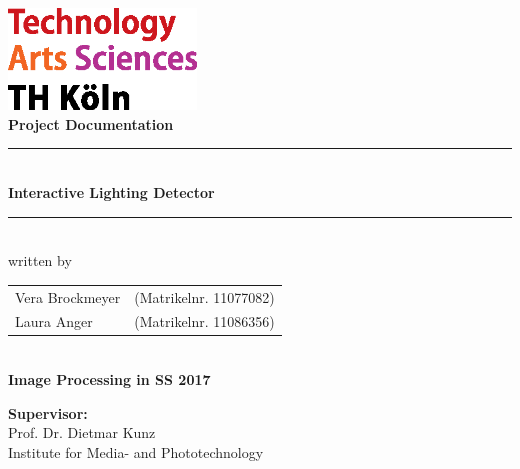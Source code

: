 \thispagestyle{empty}
\begin{center}
	\includegraphics[width=5cm]{Images/logo_TH}\\[12ex]
	{\Huge\textbf{Project Documentation}}\\[8ex]
	\rule{.8\textwidth}{.2pt}
	{\Large\\[1ex] \textbf{Interactive Lighting Detector}}\\
	\rule{.8\textwidth}{.2pt}\\[10ex]
	written by\\[2ex]
	\begin{tabular}{ll}
		Vera Brockmeyer &(Matrikelnr. 11077082)\\
		Laura Anger &(Matrikelnr. 11086356)\\ 
	\end{tabular}\\[10ex]
	\textbf{Image Processing in SS 2017}\\			
\end{center}
\vfill
\begin{flushleft}
	{\bf Supervisor:}\\
	Prof. Dr. Dietmar Kunz \\
	Institute for Media- and Phototechnology
\end{flushleft}
\newpage